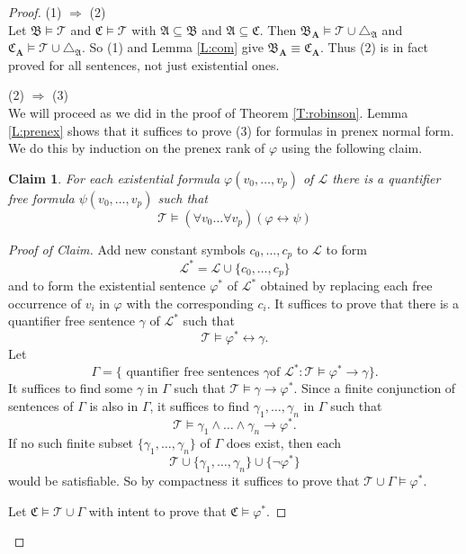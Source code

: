 \documentclass[titlepage, oneside]{amsbook}
\theoremstyle{plain}
\newtheorem*{claim}{Claim}
\theoremstyle{definition}
\theoremstyle{remark}
\newcommand{\tria}[1]{\ensuremath{\triangle_{\mathfrak{#1}}}}
\newcommand{\theory}{\ensuremath{\mathcal{T}}}
\newcommand{\lan}{\ensuremath{\mathcal{L}}}
\newcommand{\seq}{\ensuremath{\subseteq}}
\newcommand{\ma}{\ensuremath{\mathfrak{A}}}
\newcommand{\mb}{\ensuremath{\mathfrak{B}}}
\newcommand{\mc}{\ensuremath{\mathfrak{C}}}
\newcommand{\ba}{\ensuremath{\mathbf{A}}}
\newcommand{\frv}[2][0]{\ensuremath{\forall v_{#1} \dots  \forall   
v_{#2}}}
\newcommand{\cnot}[2][0]{\ensuremath{ c_{#1} , \dots , c_{#2}}}
\newcommand{\vnot}[2][0]{\ensuremath{ v_{#1} , \dots , v_{#2}}}
\begin{document}
 
\begin{proof} (1) $\Rightarrow$ (2) \\
Let $\mb \models \theory$ and $\mc \models \theory$ with $\ma \seq \mb$
and $\ma \seq \mc$.  Then $\mb_\ba \models \theory \cup \tria A$ and
$\mc_\ba \models \theory \cup \tria A$.  So (1) and Lemma \ref{L:com}
give $\mb_\ba \equiv \mc_\ba$.  Thus (2) is in fact proved for all
sentences, not just existential ones.

(2) $\Rightarrow$ (3) \\
We will proceed as we did in the proof of Theorem \ref{T:robinson}. Lemma \ref{L:prenex} shows that it suffices to prove (3) for formulas in prenex normal form.  We do this by induction on the prenex rank of
$\varphi$ using the following claim.

\begin{claim} For each existential formula $\varphi ( \vnot p )$ of $\lan$
there is a quantifier free formula $\psi ( \vnot p)$  such
that \[ \theory \models ( \frv p ) ( \varphi \leftrightarrow \psi ) \]
\end{claim}

\begin{proof}[Proof of Claim]  
Add new constant symbols $\cnot p $ to $\lan$ to form 
\[ 
\lan^{\ast} = \lan \cup \{ \cnot p \} 
\]
and to form the existential sentence $\varphi^{\ast}$ of $\lan^{\ast}$ obtained by
replacing each free occurrence of $v_i$ in $\varphi$ with the corresponding $c_i$.
It suffices to prove that there is a quantifier free sentence $\gamma$ of
$\lan^{\ast}$ such that 
\[ 
\theory \models \varphi^{\ast} \leftrightarrow \gamma . 
\]
Let
\[ 
 \Gamma= \{ \mbox{ quantifier free sentences  } \gamma \mbox{
of } \lan^{\ast} : \theory \models \varphi^{\ast} \to \gamma \}.
\]
It suffices to find some $\gamma$ in $\Gamma$ such that 
$\theory \models \gamma \to \varphi^{\ast}$.  
Since a finite conjunction of sentences of $\Gamma$ is also in $\Gamma$, it suffices to find $\gamma_1 , \dots , \gamma_n$ in $\Gamma$ such that 
\[
 \theory \models \gamma_1 \wedge \dots \wedge \gamma_n \to \varphi^{\ast}. 
\]  
If no such finite subset $\{ \gamma_1 , \dots , \gamma_n \}$
of $\Gamma$ does exist, then each 
\[ 
\theory \cup \{ \gamma_1 , \dots , \gamma_n \}\cup \{ \neg \varphi^{\ast} \} 
\] 
would be satisfiable.  So by compactness it suffices to prove that $\theory \cup \Gamma \models \varphi^{\ast}$.
        
Let $\mc \models \theory \cup \Gamma $ with intent to prove that 
$\mc \models \varphi^{\ast}$. 


\end{proof}
\end{proof}
\end{document}
